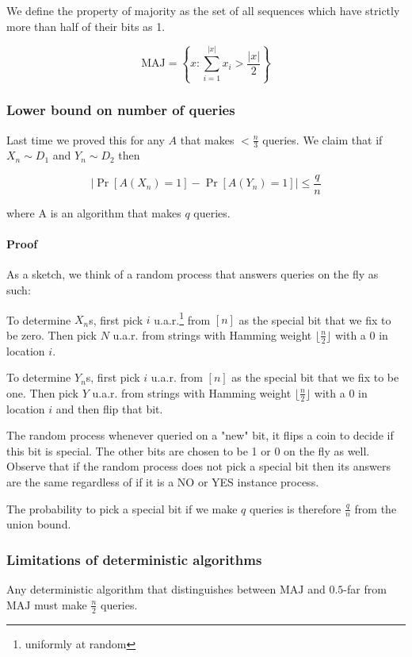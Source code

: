\documentclass{idc_msc}
\begin{document}
We define the property of majority as the set of all sequences which have strictly more than half of their bits as 1.

\[
  \mathrm{MAJ} = \left\{x : \sum_{i = 1}^{|x|} x_i > \frac{|x|}{2}\right\}
\]

\subsubsection{Lower bound on number of queries}

Last time we proved this for any \(A\) that makes \(< \frac{n}{3}\) queries.
We claim that if \(X_n \sim D_1\) and \(Y_n \sim D_2\) then

\[
  \left| \Pr[A(X_n) = 1] - \Pr[A(Y_n) = 1] \right| \le \frac{q}{n}
\]

where A is an algorithm that makes \(q\) queries.

\paragraph{Proof}

As a sketch, we think of a random process that answers queries on the fly as such:

To determine \(X_n\)s, first pick \(i\) u.a.r.\footnote{uniformly at random} from \([n]\) as the special bit that we fix to be zero.
Then pick \(N\) u.a.r. from strings with Hamming weight \(\lfloor\frac{n}{2}\rfloor\) with a 0 in location \(i\).

To determine \(Y_n\)s, first pick \(i\) u.a.r. from \([n]\) as the special bit that we fix to be one.
Then pick \(Y\) u.a.r. from strings with Hamming weight \(\lfloor\frac{n}{2}\rfloor\) with a 0 in location \(i\) and then flip that bit.

The random process whenever queried on a "new" bit, it flips a coin to decide if this bit is special.
The other bits are chosen to be 1 or 0 on the fly as well.
Observe that if the random process does not pick a special bit then its answers are the same regardless of if it is a NO or YES instance process.

The probability to pick a special bit if we make \(q\) queries is therefore \(\frac{q}{n}\) from the union bound.

\subsubsection{Limitations of deterministic algorithms}

Any deterministic algorithm that distinguishes between \(\mathrm{MAJ}\) and \(0.5\)-far from \(\mathrm{MAJ}\) must make \(\frac{n}{2}\) queries.
\end{document}
